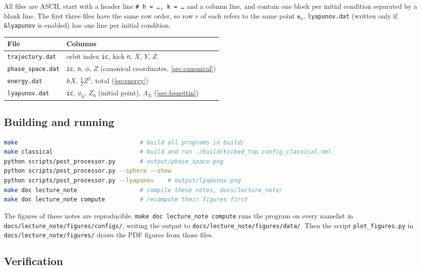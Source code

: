 \documentclass[11pt,a4paper]{article}
\newcommand{\vs}{\bm{s}}
\begin{document}
All files are ASCII, start with a header line \texttt{\# h = \dots, k = \dots} and a column line, and contain one
block per initial condition separated by a blank line. The first three files have the same row order, so row $r$ of
each refers to the same point $\vs_n$. \texttt{lyapunov.dat} (written only if \texttt{\&lyapunov} is enabled) has one line
per initial condition.
\begin{center}
\small
\begin{tabular}{ll}
  \toprule
  File & Columns \\
  \midrule
  \texttt{trajectory.dat} & orbit index \texttt{ic}, kick \texttt{n}, $X$, $Y$, $Z$ \\
  \texttt{phase\_space.dat} & \texttt{ic}, \texttt{n}, $\phi$, $Z$ \quad (canonical coordinates, \cref{sec:canonical}) \\
  \texttt{energy.dat} & $hX$, $\frac k2 Z^2$, total \quad (\cref{eq:energy}) \\
  \texttt{lyapunov.dat} & \texttt{ic}, $\phi_0$, $Z_0$ (initial point), $\Lambda_N$ \quad (\cref{sec:benettin}) \\
  \bottomrule
\end{tabular}
\end{center}

\subsection{Building and running}

\begin{lstlisting}[language=bash, numbers=none]
make                                   # build all programs in build/
make classical                         # build and run ./build/kicked_top config_classical.nml
python scripts/post_processor.py       # output/phase_space.png
python scripts/post_processor.py --sphere --show
python scripts/post_processor.py --lyapunov    # output/lyapunov.png
make doc lecture_note                  # compile these notes, docs/lecture_note/
make doc lecture_note compute          # recompute their figures first
\end{lstlisting}
The figures of these notes are reproducible. \texttt{make doc lecture\_note compute} runs the program on every
namelist in \texttt{docs/lecture\_note/figures/configs/}, writing the output to
\texttt{docs/lecture\_note/figures/data/}. Then the script \texttt{plot\_figures.py} in
\texttt{docs/lecture\_note/figures/} draws the PDF figures from those files.

\subsection{Verification}
\end{document}
